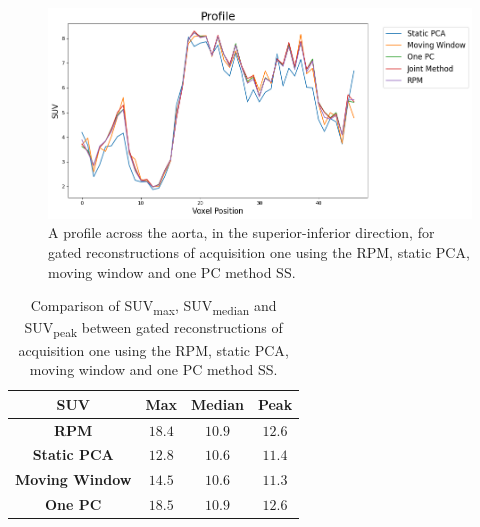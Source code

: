             \begin{figure}
                \centering
                
                \includegraphics[width=1.0\linewidth]{figures/data_driven_surrogate_signal_extraction_results_1_profile_pca.png}
                
                \captionsetup{singlelinecheck=false, justification=centering}
                \caption{A profile across the aorta, in the superior-inferior direction, for gated reconstructions of acquisition one using the \gls{RPM}, static \gls{PCA}, moving window and one \gls{PC} method \gls{SS}.}
                \label{fig:pca_data_driven_surrogate_signal_extraction_methods_for_dynamic_pet_results_profile}
            \end{figure}
            
            \begin{table}
                \centering
                
                \captionsetup{singlelinecheck=false, justification=centering}
                \caption{Comparison of \gls{SUV}\textsubscript{max}, \gls{SUV}\textsubscript{median} and \gls{SUV}\textsubscript{peak} between gated reconstructions of acquisition one using the \gls{RPM}, static \gls{PCA}, moving window and one \gls{PC} method \gls{SS}.}
                
                \resizebox*{0.75\linewidth}{!}
                {
                    \begin{tabular}{||c|ccc||}
                        \hline
                        \textbf{\gls{SUV}} & \textbf{Max} & \textbf{Median} & \textbf{Peak} \\
                        \hline
                        \textbf{\gls{RPM}}          & $18.4$ & $10.9$ & $12.6$ \\
                        \hline
                        \textbf{Static \gls{PCA}}   & $12.8$ & $10.6$ & $11.4$ \\
                        \textbf{Moving Window}      & $14.5$ & $10.6$ & $11.3$ \\
                        \textbf{One \gls{PC}}       & $18.5$ & $10.9$ & $12.6$ \\
                        \hline
                    \end{tabular}
                }
                \label{tab:pca_data_driven_surrogate_signal_extraction_methods_for_dynamic_pet_results_suv}
            \end{table}
            
